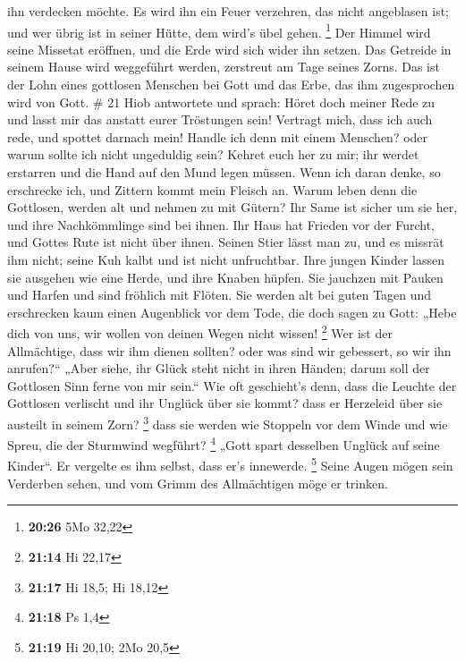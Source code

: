 ihn verdecken möchte. Es wird ihn ein Feuer verzehren, das nicht
angeblasen ist; und wer übrig ist in seiner Hütte, dem wird's übel
gehen. \footnote{\textbf{20:26} 5Mo 32,22}  Der Himmel wird
seine Missetat eröffnen, und die Erde wird sich wider ihn setzen.
 Das Getreide in seinem Hause wird weggeführt werden,
zerstreut am Tage seines Zorns.  Das ist der Lohn eines
gottlosen Menschen bei Gott und das Erbe, das ihm zugesprochen wird von
Gott. \# 21  Hiob antwortete und sprach:  Höret
doch meiner Rede zu und lasst mir das anstatt eurer Tröstungen sein!
 Vertragt mich, dass ich auch rede, und spottet darnach
mein!  Handle ich denn mit einem Menschen? oder warum sollte
ich nicht ungeduldig sein?  Kehret euch her zu mir; ihr
werdet erstarren und die Hand auf den Mund legen müssen. 
Wenn ich daran denke, so erschrecke ich, und Zittern kommt mein Fleisch
an.  Warum leben denn die Gottlosen, werden alt und nehmen
zu mit Gütern?  Ihr Same ist sicher um sie her, und ihre
Nachkömmlinge sind bei ihnen.  Ihr Haus hat Frieden vor der
Furcht, und Gottes Rute ist nicht über ihnen.  Seinen Stier
lässt man zu, und es missrät ihm nicht; seine Kuh kalbt und ist nicht
unfruchtbar.  Ihre jungen Kinder lassen sie ausgehen wie
eine Herde, und ihre Knaben hüpfen.  Sie jauchzen mit
Pauken und Harfen und sind fröhlich mit Flöten.  Sie werden
alt bei guten Tagen und erschrecken kaum einen Augenblick vor dem Tode,
 die doch sagen zu Gott: „Hebe dich von uns, wir wollen von
deinen Wegen nicht wissen! \footnote{\textbf{21:14} Hi 22,17}
 Wer ist der Allmächtige, dass wir ihm dienen sollten? oder
was sind wir gebessert, so wir ihn anrufen?{}``  „Aber
siehe, ihr Glück steht nicht in ihren Händen; darum soll der Gottlosen
Sinn ferne von mir sein.``  Wie oft geschieht's denn, dass
die Leuchte der Gottlosen verlischt und ihr Unglück über sie kommt? dass
er Herzeleid über sie austeilt in seinem Zorn? \footnote{\textbf{21:17}
  Hi 18,5; Hi 18,12}  dass sie werden wie Stoppeln vor dem
Winde und wie Spreu, die der Sturmwind wegführt? \footnote{\textbf{21:18}
  Ps 1,4}  „Gott spart desselben Unglück auf seine
Kinder``. Er vergelte es ihm selbst, dass er's innewerde. \footnote{\textbf{21:19}
  Hi 20,10; 2Mo 20,5}  Seine Augen mögen sein Verderben
sehen, und vom Grimm des Allmächtigen möge er trinken. 
